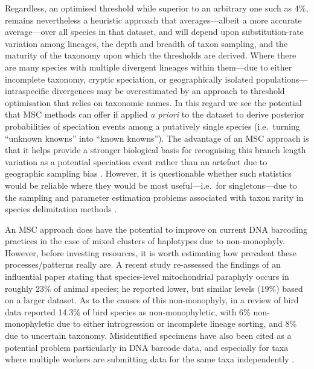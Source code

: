 \documentclass[12pt]{article}
\begin{document}
Regardless, an optimised threshold while superior to an arbitrary one such as 4\%, remains nevertheless a heuristic approach that averages---albeit a more accurate average---over all species in that dataset, and will depend upon substitution-rate variation among lineages, the depth and breadth of taxon sampling, and the maturity of the taxonomy upon which the thresholds are derived. Where there are many species with multiple divergent lineages within them---due to either incomplete taxonomy, cryptic speciation, or geographically isolated populations---intraspecific divergences may be overestimated by an approach to threshold optimisation that relies on taxonomic names. In this regard we see the potential that MSC methods can offer if applied \emph{a priori} to the dataset to derive posterior probabilities of speciation events among a putatively single species (i.e.\ turning ``unknown knowns'' into ``known knowns''). The advantage of an MSC approach is that it helps provide a stronger biological basis for recognising this branch length variation as a potential speciation event rather than an artefact due to geographic sampling bias \citep{Bergsten2012}. However, it is questionable whether such statistics would be reliable where they would be most useful---i.e.\ for singletons---due to the sampling and parameter estimation problems associated with taxon rarity in species delimitation  methods \citep{Lim2012}.

An MSC approach does have the potential to improve on current DNA barcoding practices in the case of mixed clusters of haplotypes due to non-monophyly. However, before investing resources, it is worth estimating how prevalent these processes/patterns really are. A recent study \citep{Ross2014} re-assessed the findings of an influential paper \citep{Funk2003} stating that species-level mitochondrial paraphyly occurs in roughly 23\% of animal species; he reported lower, but similar levels (19\%) based on a larger dataset. As to the causes of this non-monophyly, in a review of bird data \citep{McKay2010} reported 14.3\% of bird species as non-monophyletic, with 6\% non-monophyletic due to either introgression or incomplete lineage sorting, and 8\% due to uncertain taxonomy. Misidentified specimens have also been cited as a potential problem particularly in DNA barcode data, and especially for taxa where multiple workers are submitting data for the same taxa independently \citep{Collins2013}. 
\end{document}
